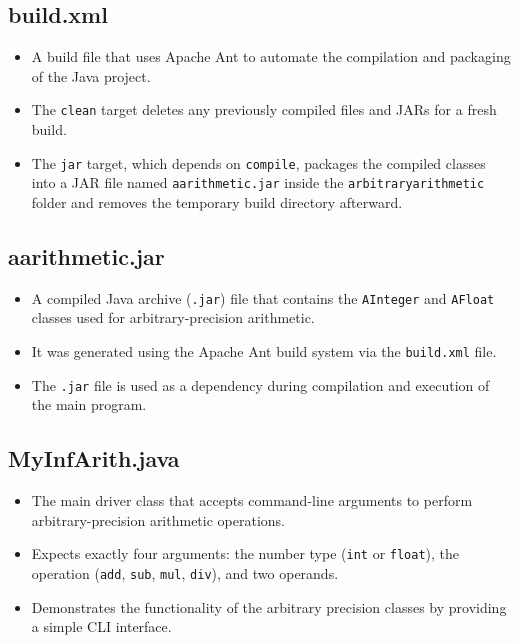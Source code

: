 \documentclass[12pt]{article}
\begin{document}
\subsection{build.xml}
\begin{itemize}
    \item A build file that uses Apache Ant to automate the compilation and packaging of the Java project.
    \item The \texttt{clean} target deletes any previously compiled files and JARs for a fresh build.
    \item The \texttt{jar} target, which depends on \texttt{compile}, packages the compiled classes into a JAR file named \texttt{aarithmetic.jar} inside the \texttt{arbitraryarithmetic} folder and removes the temporary build directory afterward.
\end{itemize}

\subsection{aarithmetic.jar}
\begin{itemize}
    \item A compiled Java archive (\texttt{.jar}) file that contains the \texttt{AInteger} and \texttt{AFloat} classes used for arbitrary-precision arithmetic.
    \item It was generated using the Apache Ant build system via the \texttt{build.xml} file.
    \item The \texttt{.jar} file is used as a dependency during compilation and execution of the main program.
\end{itemize}

\subsection{MyInfArith.java}
\begin{itemize}
    \item The main driver class that accepts command-line arguments to perform arbitrary-precision arithmetic operations.
    \item Expects exactly four arguments: the number type (\texttt{int} or \texttt{float}), the operation (\texttt{add}, \texttt{sub}, \texttt{mul}, \texttt{div}), and two operands.
    \item Demonstrates the functionality of the arbitrary precision classes by providing a simple CLI interface.
\end{itemize}
\end{document}
